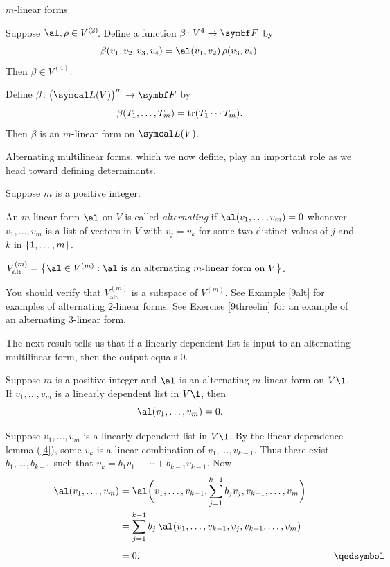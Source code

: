 \begin{example}{$m$-linear forms}
\begin{Itemize}
\item
Suppose $\al, \rho \in V^{(2)}\!$. Define a function $\fun \beta {V^4} {\F{}}$ by
\[
\beta(v_1, v_2, v_3, v_4) = \al(v_1, v_2) \,\rho(v_3, v_4).
\]
Then $\beta \in V^{(4)}\!$.

\item
Define $\fun \beta { \paren[\big]{\L(V)}^m } {\F{}}$ by
\[
\beta(T_1, \ldots, T_m) = \operatorname{tr}(T_1 \cdots T_m).
\]
Then $\beta$ is an $m$-linear form on $\L(V)$.
\end{Itemize}
\exampleitemend
\vspace{-2bp}
\end{example}

\pagebreak[3]

Alternating multilinear forms, which we now define, play an important role as we head toward defining determinants.

{Suppose $m$ is a positive integer.
\begin{Itemize}
\item
An $m$-linear form $\al$ on $V$ is called \emph{alternating} if $\al(v_1, \ldots, v_m) = 0$ whenever
$v_1, \ldots, v_m$ is a list of vectors in $V$ with $v_j = v_k$ for some two distinct values of $j$ and $k$ in
$\{1, \ldots, m\}$.
\item
$V^{(m)}_{\text{alt}} = \br[\big]{ \al \in V^{(m)}: \al \text{ is an alternating $m$-linear form on } V }$.
\end{Itemize}}

You should verify that $V^{(m)}_{\text{alt}}$ is a subspace of $V^{(m)}\!$. See Example \ref{9alt} for examples of alternating $2$-linear forms. See Exercise \ref{9threelin} for an example of an alternating $3$-linear form.

The next result tells us that if a linearly dependent list is input to an alternating multilinear form, then the output equals $0$.

{Suppose $m$ is a positive integer and $\al$ is an alternating $m$-linear form on $V\1$. If $v_1, \ldots, v_m$ is a linearly dependent list in $V\1$, then
\[
\al(v_1, \ldots, v_m) = 0.
\]}

\proof
Suppose $v_1, \ldots, v_m$ is a linearly dependent list in $V\1$. By the linear dependence lemma (\ref{4}), some $v_k$ is a linear combination of $v_1, \ldots, v_{k-1}$. Thus there exist $b_1, \ldots, b_{k-1}$ such that
$v_k = b_1 v_1 + \cdots + b_{k-1} v_{k-1}$. Now
\begin{align*}
\al(v_1, \ldots, v_m) &= \al\paren[\bigg]{ v_1, \ldots, v_{k-1}, \sum_{j=1}^{k-1} b_j v_j, v_{k+1}, \ldots, v_m } \\
&= \sum_{j=1}^{k-1} b_j \, \al( v_1, \ldots, v_{k-1}, v_j, v_{k+1}, \ldots, v_m) \\[4bp]
&= 0.
\rlap{\hspace{2.77in}\text{\qedsymbol}}
\end{align*}

